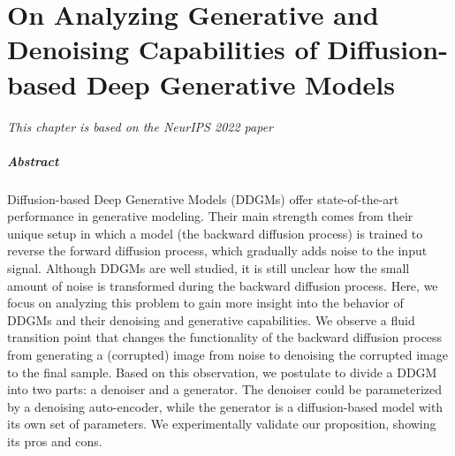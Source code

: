 



\chapter[On Analyzing Generative and Denoising Capabilities of DDGMs]{On Analyzing Generative and Denoising Capabilities of Diffusion-based Deep Generative Models}\label{chap:daed}

\begin{quote}
\normalsize\itshape
\begin{flushright}
\end{flushright}
\end{quote}



\begin{flushright}
	\small{
		\textit{
			\hfill This chapter is based on the NeurIPS 2022 paper \citep{deja2022analyzing} 
		} 
		
	}
\end{flushright}

\paragraph{Abstract}

Diffusion-based Deep Generative Models (DDGMs) offer state-of-the-art performance in generative modeling. Their main strength comes from their unique setup in which a model (the backward diffusion process) is trained to reverse the forward diffusion process, which gradually adds noise to the input signal. Although DDGMs are well studied, it is still unclear how the small amount of noise is transformed during the backward diffusion process. 
Here, we focus on analyzing this problem to gain more insight into the behavior of DDGMs and their denoising and generative capabilities. We observe a fluid transition point that changes the functionality of the backward diffusion process from generating a (corrupted) image from noise to denoising the corrupted image to the final sample. Based on this observation, we postulate to divide a DDGM into two parts: a denoiser and a generator. The denoiser could be parameterized by a denoising auto-encoder, while the generator is a diffusion-based model with its own set of parameters. We experimentally validate our proposition, showing its pros and cons.

